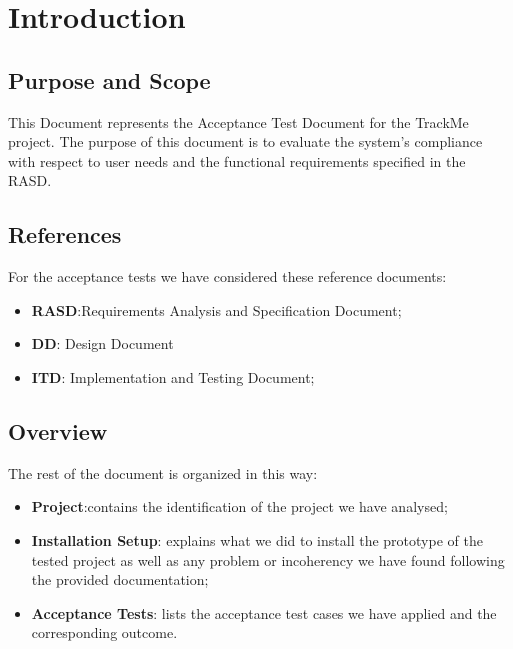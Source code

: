 \section{Introduction}

\subsection{Purpose and Scope}
	This Document represents the Acceptance Test Document for the TrackMe project. The purpose of this document is to evaluate the system's
compliance with respect to user needs and the functional requirements specified in the RASD.

\subsection{References }
For the acceptance tests we have considered these reference documents:
\begin{itemize}
	\item \textbf{RASD}:Requirements Analysis and Specification Document;
	\item \textbf{DD}: Design Document
	\item \textbf{ITD}: Implementation and Testing Document;
\end{itemize}

\subsection{Overview }
The rest of the document is organized in this way:
\begin{itemize}
	\item \textbf{Project}:contains the identification of the project we have analysed;
	\item \textbf{Installation Setup}: explains what we did to install the prototype of the tested project as well as any problem or incoherency we have found following the provided documentation;
	\item \textbf{Acceptance Tests}: lists the acceptance test cases we have applied and the corresponding outcome.
\end{itemize}